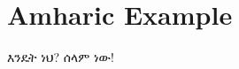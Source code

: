 \documentclass{article}
\begin{document}
\section*{Amharic Example}

\amharicfont እንዴት ነህ? ሰላም ነው!
\end{document}

